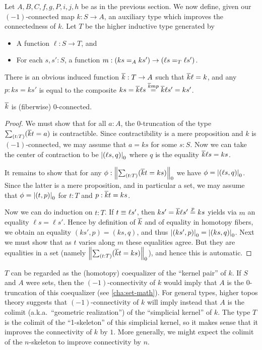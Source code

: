 Let $A,B,C,f,g,P,i,j,h$ be as in the previous section.
We now define, given our $(-1)$-connected map $k:S\to A$, an auxiliary type which improves the connectedness of $k$.
Let $T$ be the higher inductive type generated by
\begin{itemize}
\item A function $\ell:S\to T$, and
\item For each $s,s':S$, a function $m:(\id[A]{ks}{ks'}) \to (\id[T]{\ell s}{\ell s'})$.
\end{itemize}
There is an obvious induced function $\kbar:T\to A$ such that $\kbar \ell = k$, and any $p:ks=ks'$ is equal to the composite $ks = \kbar \ell s \overset{\kbar m p}{=} \kbar \ell s' = k s'$.

\begin{lem}\label{thm:kbar}
  $\kbar$ is (fiberwise) 0-connected.
\end{lem}
\begin{proof}
  We must show that for all $a:A$, the 0-truncation of the type $\sm{t:T}(\kbar t = a)$ is contractible.
  Since contractibility is a mere proposition and $k$ is $(-1)$-connected, we may assume that $a=ks$ for some $s:S$.
  Now we can take the center of contraction to be $\tproj0{(\ell s,q)}$ where $q$ is the equality $\kbar\ell s = k s$.

  It remains to show that for any $\phi:\trunc0{\sm{t:T} (\kbar t = ks)}$ we have $\phi = \tproj0{(\ell s,q)}$.
  Since the latter is a mere proposition, and in particular a set, we may assume that $\phi=\tproj0{(t,p)}$ for $t:T$ and $p:\kbar t = ks$.

  Now we can do induction on $t:T$.
  If $t\jdeq\ell s'$, then $ks' = \kbar \ell s' \overset{p}{=} ks$ yields via $m$ an equality $\ell s = \ell s'$.
  Hence by definition of $\kbar$ and of equality in homotopy fibers, we obtain an equality $(ks',p) = (ks,q)$, and thus $\tproj0{(ks',p)} = \tproj0{(ks,q)}$.
  Next we must show that as $t$ varies along $m$ these equalities agree.
  But they are equalities in a set (namely $\trunc0{\sm{t:T} (\kbar t = ks)}$), and hence this is automatic.
\end{proof}

\begin{rmk}
  $T$ can be regarded as the (homotopy) coequalizer of the ``kernel pair'' of $k$.
  If $S$ and $A$ were sets, then the $(-1)$-connectivity of $k$ would imply that $A$ is the $0$-truncation of this coequalizer (see \autoref{cha:set-math}).
  For general types, higher topos theory suggests that $(-1)$-connectivity of $k$ will imply instead that $A$ is the colimit (a.k.a.\ ``geometric realization'') of the ``simplicial kernel'' of $k$.
  The type $T$ is the colimit of the ``1-skeleton'' of this simplicial kernel, so it makes sense that it improves the connectivity of $k$ by $1$.
  More generally, we might expect the colimit of the $n$-skeleton to improve connectivity by $n$.
\end{rmk}

